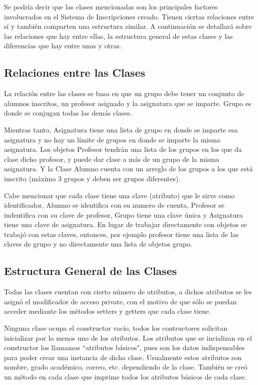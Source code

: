 \documentclass[12pt, letterpaper]{report}
\begin{document}
Se podría decir que las clases mencionadas son los principales factores involucrados en el Sistema de Inscripciones creado. Tienen ciertas relaciones entre sí y también comparten una estructura similar. A continuación se detallará sobre las relaciones que hay entre ellas, la estructura general de estas clases y las diferencias que hay entre unas y otras. 

\subsection*{Relaciones entre las Clases}
La relación entre las clases se basa en que un grupo debe tener un conjunto de alumnos inscritos, un profesor asignado y la asignatura que se imparte. Grupo es donde se conjugan todas las demás clases. 

Mientras tanto, Asignatura tiene una lista de grupo en donde se imparte esa asignatura y no hay un límite de grupos en donde se imparte la misma asignatura. Los objetos Profesor tendrán una lista de los grupos en los que da clase dicho profesor, y puede dar clase a más de un grupo de la misma asignatura. Y la Clase Alumno cuenta con un arreglo de los grupos a los que está inscrito (máximo 3 grupos y deben ser grupos diferentes). 

Cabe mencionar que cada clase tiene una clave (atributo) que le sirve como identificador, Alumno se identifica con su numero de cuenta, Profesor se indentifica con su clave de profesor, Grupo tiene una clave única y Asignatura tiene una clave de asignatura. En lugar de trabajar directamente con objetos se trabajó con estas claves, entonces, por ejemplo profesor tiene una lista de las claves de grupo y no directamente una lista de objetos grupo. 

\subsection*{Estructura General de las Clases}
Todas las clases cuentan con cierto número de atributos, a dichos atributos se les asignó el modificador de acceso  private, con el motivo de que sólo se puedan acceder mediante los métodos setters y getters que cada clase tiene. 

Ninguna clase ocupa el constructor vacío, todos los contructores solicitan inicializar por lo menos uno de los atributos. Los atributos que se incializan en el constructor los llamamos ``atributos básicos", pues son los datos indispensables para poder crear una instancia de dicha clase. Usualmente estos atributos son nombre, grado académico, correo, etc. dependiendo de la clase.  También se creó un método en cada clase que imprime todos los atributos básicos de cada clase.
\end{document}
